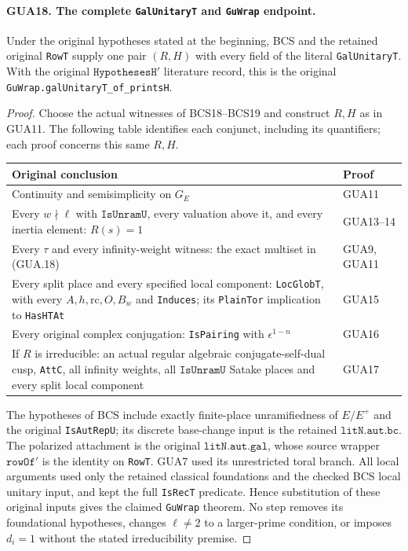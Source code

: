 \paragraph{GUA18. The complete \texttt{GalUnitaryT} and \texttt{GuWrap} endpoint.}
\label{claim:GUA18}
Under the original hypotheses stated at the beginning,
BCS and the retained original \texttt{RowT} supply
one pair $(R,H)$ with every field of the literal
\texttt{GalUnitaryT}.  With the original
$\texttt{HypothesesH}'$ literature record, this is
the original \texttt{GuWrap.galUnitaryT\_of\_printsH}.
\begin{proof}
Choose the actual witnesses of BCS18--BCS19 and construct
$R,H$ as in GUA11.  The following table identifies
each conjunct, including its quantifiers; each
proof concerns this same $R,H$.
\begin{center}
\begin{tabular}{p{.69\linewidth}p{.19\linewidth}}
\hline
Original conclusion & Proof \\
\hline
Continuity and semisimplicity on $G_E$ & GUA11 \\
Every $w\nmid\ell$ with $\texttt{IsUnramU}$,
every valuation above it, and every inertia element:
$R(s)=1$ & GUA13--14 \\
Every $\tau$ and every infinity-weight witness:
the exact multiset in (GUA.18) & GUA9, GUA11 \\
Every split place and every specified local component:
\texttt{LocGlobT}, with every $A,h,\mathrm{rc},O,B_w$
and \texttt{Induces}; its \texttt{PlainTor}
implication to \texttt{HasHTAt} & GUA15 \\
Every original complex conjugation:
\texttt{IsPairing} with $\epsilon^{1-n}$ & GUA16 \\
If $R$ is irreducible: an actual regular algebraic
conjugate-self-dual cusp, \texttt{AttC}, all infinity
weights, all $\texttt{IsUnramU}$ Satake places and
every split local component & GUA17 \\
\hline
\end{tabular}
\end{center}
The hypotheses of BCS include exactly finite-place
unramifiedness of $E/E^+$ and the original
\texttt{IsAutRepU}; its discrete base-change input
is the retained $\texttt{litN.aut.bc}$.  The
polarized attachment is the original
$\texttt{litN.aut.gal}$, whose source wrapper
$\texttt{rowOf}'$ is the identity on \texttt{RowT}.
GUA7 used its unrestricted toral branch.  All
local arguments used only the retained classical
foundations and the checked BCS local unitary
input, and kept the full \texttt{IsRecT}
predicate.  Hence substitution of these original
inputs gives the claimed \texttt{GuWrap} theorem.
No step removes its foundational hypotheses, changes
$\ell\ne2$ to a larger-prime condition, or imposes
$d_i=1$ without the stated irreducibility premise.
\end{proof}

